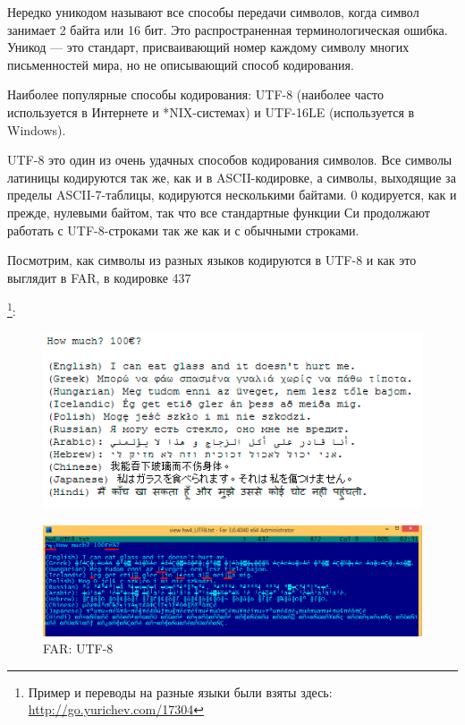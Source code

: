 
Нередко уникодом называют все способы передачи символов, когда символ занимает 2 байта или 16 бит.
Это распространенная терминологическая ошибка.
Уникод --- это стандарт, присваивающий номер каждому символу многих письменностей мира, но не описывающий
способ кодирования.

Наиболее популярные способы кодирования: 
UTF-8 (наиболее часто используется в Интернете и *NIX-системах) и UTF-16LE (используется в Windows).


UTF-8 это один из очень удачных способов кодирования символов.
Все символы латиницы кодируются так же, как и в ASCII-кодировке, а символы, выходящие за пределы
ASCII-7-таблицы, кодируются несколькими байтами.
0 кодируется, как и прежде, нулевыми байтом, так что все стандартные
функции Си продолжают работать с UTF-8-строками так же как и с обычными строками.

Посмотрим, как символы из разных языков кодируются в UTF-8 и как это выглядит в FAR, в кодировке 437

\footnote{Пример и переводы на разные языки были взяты здесь: 
\url{http://go.yurichev.com/17304}}:

\begin{figure}[H]
\centering
\includegraphics[scale=\NormalScale]{digging_into_code/strings/multilang_sampler.png}
\end{figure}

\begin{figure}[H]
\centering
\includegraphics[scale=\FigScale]{digging_into_code/strings/multilang_sampler_UTF8.png}
\caption{FAR: UTF-8}
\end{figure}


